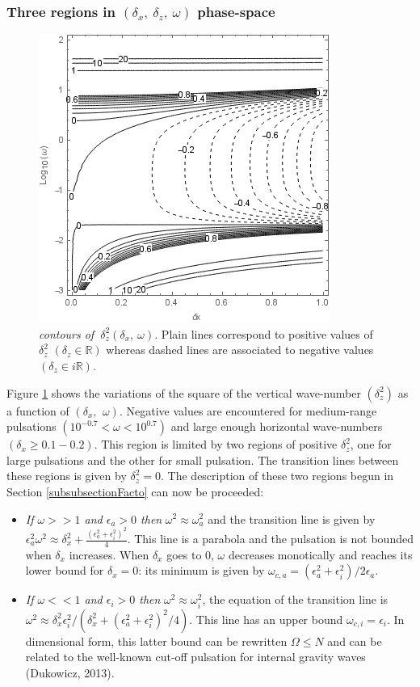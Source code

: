 \documentclass[a4paper,11pt]{article}
\begin{document}
\subsubsection{Three regions in $(\delta_x,\ \delta_z,\ \omega)$ phase-space}
\label{SubSectionDeltaz}
\begin{figure}[!h]
	\centering	
	\includegraphics[width=0.5\linewidth]{FIGURES/Contour_dz.png}
	\caption{\textit{contours of $\ \delta_z^2(\delta_x,\ \omega)$}. Plain lines correspond to positive values of $\delta_z^2$ $(\delta_z\in\mathbb{R})$ whereas dashed lines are associated to negative values $(\delta_z\in i\mathbb{R})$.}
	\label{FigContourdz}
\end{figure}
Figure \ref{FigContourdz} shows the variations of the square of the vertical wave-number $(\delta_z^2)$ as a function of $(\delta_x,\ \,\omega)$.  Negative values are encountered for medium-range pulsations $(10^{-0.7}<\omega<10^{0.7})$ and large enough horizontal wave-numbers $(\delta_x \geq 0.1-0.2)$. This region is limited by two regions of positive $\delta_z^2$, one for large pulsations and the other for small pulsation. The transition lines between these regions is given by $\delta_z^2=0$. The description of these two regions begun in Section \ref{subsubsectionFacto} can now be proceeded:
\begin{itemize}
	\item \textit{If $\omega>>1$ and $\epsilon_a>0$ then} $\omega^2\approx\omega_a^2$ and the transition line is given by 
	$\epsilon_a^2\omega^2 \approx
	\delta_x^2
 	+\frac{(\epsilon_a^2+\epsilon_i^2)^2}{4}$. This line is a parabola and the pulsation is not bounded when $\delta_x$ increases. 
 	When $\delta_x$ goes to 0, $\omega$ decreases monotically and reaches its lower bound for $\delta_x=0$: its minimum is given by $\omega_{c,a}=(\epsilon_a^2+\epsilon_i^2)/2\epsilon_a$.
	\item \textit{If $\omega<<1$ and $\epsilon_i>0$ then} $\omega^2\approx\omega_i^2$, the equation of the transition line is $\omega^2\approx\delta_x^2\epsilon_i^2/(\delta_x^2+(\epsilon_a^2+\epsilon_i^2)^2/4)$. This line has an upper bound $\omega_{c,i}=\epsilon_i$.
	In dimensional form, this latter bound can be rewritten $\Omega\leq N$ and can be related to the well-known cut-off pulsation for internal gravity waves (Dukowicz, 2013).
\end{itemize}
\end{document}
